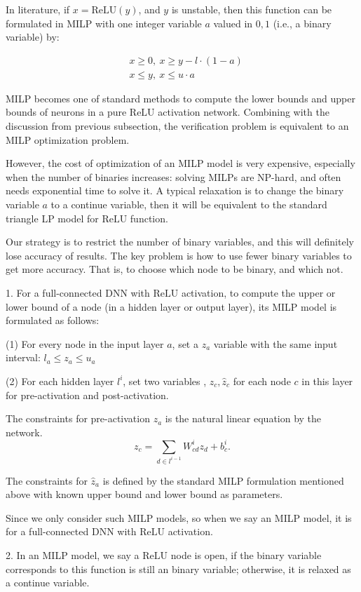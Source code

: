 \documentclass{llncs}
\newcommand{\ReLU}{\mathrm{ReLU}}
\begin{document}
In literature, if $x=\ReLU(y)$, and $y$ is unstable, then this function can be formulated in MILP with one integer variable $a$ valued in ${0,1}$ (i.e., a binary variable) by:

\vspace*{-4ex}

\begin{align*}
	&x \geq 0, \ 
	x \geq y-l\cdot (1-a)\\
	&x \leq y,\ 
	x \leq u\cdot a
\end{align*} 

MILP becomes one of standard methods to compute the lower bounds and upper bounds of neurons in a pure $\ReLU$ activation network. Combining with the discussion from previous subsection, the verification problem is equivalent to an MILP optimization problem.


However, the cost of optimization of an MILP model is very expensive, especially when the number of binaries increases: solving MILPs are NP-hard, and often needs exponential time to solve it. A typical relaxation is to change the binary variable $a$ to a continue variable, then it will be equivalent to the standard triangle LP model for $\ReLU$ function.

Our strategy is to restrict the number of binary variables, and this will definitely lose accuracy of results.  The key problem is how to use fewer binary variables to get more accuracy. That is, to choose which node to be binary, and which not.

\begin{definition}
	1. For a full-connected DNN with $\ReLU$ activation, to compute the upper or lower bound of a node (in a hidden layer or output layer), its MILP model is formulated as follows: 
	
	(1) For every node in the input layer $a$, set a $z_a$ variable with the same input interval: $l_a\leq z_a\leq u_a$
	
	(2) For each hidden layer $l^i$, set two variables , $z_c,\hat{z}_c$ for each node $c$ in this layer for pre-activation and post-activation. 
	
	The constraints for pre-activation $z_a$ is the natural linear equation by the network. 	$$z_c=\sum_{d\in l^{i-1}} W^i_{cd} z_d+b^i_c.$$
	
	
	The constraints for $\hat{z}_a$ is defined by the standard MILP formulation mentioned above with known upper bound and lower bound as parameters.
	
	\vspace*{1ex}
	
	Since we only consider such MILP models, so when we say an MILP model, it is for a full-connected DNN with $\ReLU$ activation. 
	
	2. In an MILP model, we say a $\ReLU$ node is open, if the binary variable corresponds to this function is still an binary variable; otherwise, it is relaxed as a continue variable. 
\end{definition}
\end{document}
